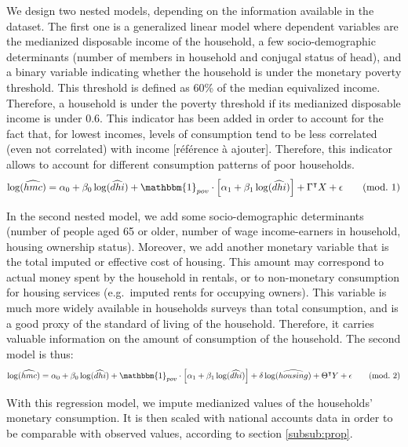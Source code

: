 We design two nested models, depending on the information available in the dataset. The first one is a generalized linear model where dependent variables are the medianized disposable income of the household, a few socio-demographic determinants (number of members in household and conjugal status of head), and a binary variable indicating whether the household is under the monetary poverty threshold. This threshold is defined as 60\% of the median equivalized income. Therefore, a household is under the poverty threshold if its medianized disposable income is under 0.6. This indicator has been added in order to account for the fact that, for lowest incomes, levels of consumption tend to be less correlated (even not correlated) with income [référence à ajouter]. Therefore, this indicator allows to account for different consumption patterns of poor households.
\begin{equation}
\label{equ:mod1}
    \log(\widehat{hmc}) = \alpha_0 +\beta_0\log(\widehat{dhi})
    + \mathbbm{1}_{pov}\cdot\left[\alpha_1 + \beta_1\log(\widehat{dhi})\right] + \Gamma^\intercal X + \epsilon
    \tag{mod.\ 1}
\end{equation}

In the second nested model, we add some socio-demographic determinants (number of people aged 65 or older, number of wage income-earners in household, housing ownership status). Moreover, we add another monetary variable that is the total imputed or effective cost of housing. This amount may correspond to actual money spent by the household in rentals, or to non-monetary consumption for housing services (e.g.\ imputed rents for occupying owners). This variable is much more widely available in households surveys than total consumption, and is a good proxy of the standard of living of the household. Therefore, it carries valuable information on the amount of consumption of the household. The second model is thus:
\begin{equation}
\label{equ:mod2}
    \log(\widehat{hmc}) = \alpha_0 +\beta_0\log(\widehat{dhi})
    + \mathbbm{1}_{pov}\cdot\left[\alpha_1 + \beta_1\log(\widehat{dhi})\right]
    + \delta\log(\widehat{housing}) + \Theta^\intercal Y + \epsilon
    \tag{mod.\ 2}
\end{equation}

With this regression model, we impute medianized values of the households' monetary consumption. It is then scaled with national accounts data in order to be comparable with observed values, according to section \ref{subsub:prop}.

